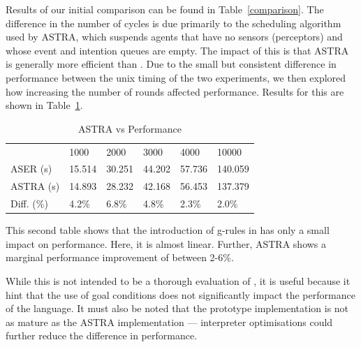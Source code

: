 Results of our initial comparison can be found in Table~\ref{comparison}. The difference
in the number of cycles is due primarily to the scheduling algorithm used by ASTRA, which
suspends agents that have no sensors (perceptors) and whose event and intention queues are empty.
The impact of this is that ASTRA is generally more efficient than {\aser}. Due to the small but 
consistent difference in performance between the unix timing of the two experiments, we then 
explored how increasing the number of rounds affected performance. Results for this are shown 
in Table~\ref{rounds}.

\begin{table}[]
\centering
\caption{ASTRA vs {\aser} Performance}
\label{rounds}
\begin{tabular}{llllll}
           & 1000   & 2000   & 3000   & 4000   & 10000   \\
ASER (s)   & 15.514 & 30.251 & 44.202 & 57.736 & 140.059 \\
ASTRA (s)  & 14.893 & 28.232 & 42.168 & 56.453 & 137.379 \\
Diff. (\%) & 4.2\%  & 6.8\%  & 4.8\%  & 2.3\%  & 2.0\%  
\end{tabular}
\end{table}

This second table shows that the introduction of g-rules in {\aser} has only a small impact on 
performance. Here, it is almost linear. Further, ASTRA shows a marginal performance improvement of between 2-6\%.

While this is not intended to be a thorough evaluation of {\aser}, it is useful because
it hint that the use of goal conditions does not significantly impact the performance 
of the language. It must also be noted that the prototype implementation is not as mature 
as the ASTRA implementation --- interpreter optimisations could further reduce the difference 
in performance.
